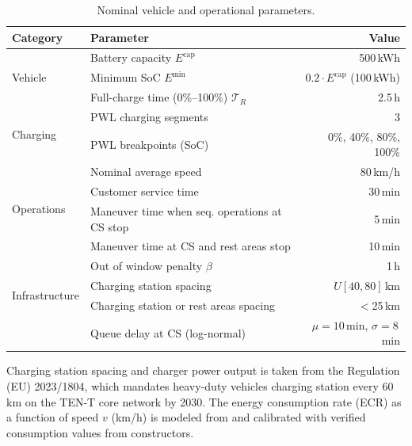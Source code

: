 \documentclass[preprint,12pt,3p]{elsarticle}
\begin{document}
\begin{table}[ht]
\centering
\caption{Nominal vehicle and operational parameters.}
\label{tab:params}
\begin{tabular}{llr}
\toprule
\textbf{Category} & \textbf{Parameter} & \textbf{Value} \\
\midrule
\multirow{3}{*}{Vehicle}
  & Battery capacity $E^{\mathrm{cap}}$        & 500\,kWh \\
  & Minimum SoC $E^{\min}$                      & $0.2\cdot E^{\mathrm{cap}}$ (100\,kWh) \\
  & Full-charge time (0\%--100\%) $\mathcal{T}_R$ & 2.5\,h \\
\midrule
\multirow{2}{*}{Charging}
  & PWL charging segments                       & 3 \\
  & PWL breakpoints (SoC)                       & 0\%, 40\%, 80\%, 100\% \\
\midrule
\multirow{4}{*}{Operations}
  & Nominal average speed                       & 80\,km/h \\
  & Customer service time                       & 30\,min \\
  & Maneuver time when seq. operations at CS stop               & 5\,min \\
  & Maneuver time at CS and rest areas stop               & 10\,min \\
  & Out of window penalty $\beta$ & 1\,h \\
\midrule
\multirow{2}{*}{Infrastructure}
  & Charging station spacing                    & $U[40, 80]$\,km \\
  & Charging station or rest areas spacing      & $<$25\,km \\
  & Queue delay at CS (log-normal)              & $\mu = 10$\,min, $\sigma = 8$\,min \\
\bottomrule
\end{tabular}
\end{table}

Charging station spacing and charger power output is taken from the Regulation (EU) 2023/1804, which mandates heavy-duty vehicles charging station every 60 km on the TEN-T core network by 2030. The energy consumption rate (ECR) as a function of speed $v$ (km/h) is modeled from \citet{gao_estimating_2025} and calibrated with verified consumption values from constructors.

\end{document}
